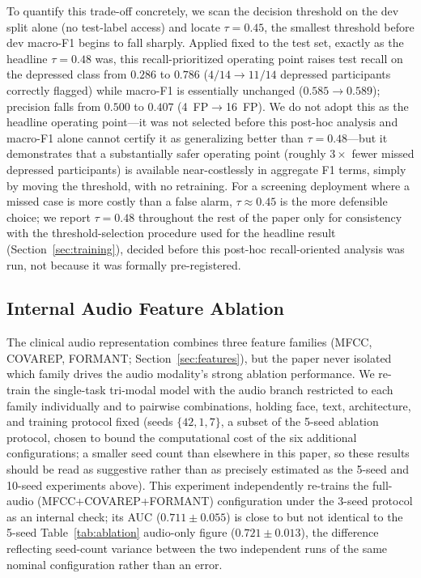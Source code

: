 \documentclass[journal]{IEEEtran}
\begin{document}
To quantify this trade-off concretely, we scan the decision threshold
on the dev split alone (no test-label access) and locate
$\tau{=}0.45$, the smallest threshold before dev macro-F1 begins to
fall sharply. Applied fixed to the test set, exactly as the headline
$\tau{=}0.48$ was, this recall-prioritized operating point raises
test recall on the depressed class from $0.286$ to $0.786$
($4/14\to11/14$ depressed participants correctly flagged) while
macro-F1 is essentially unchanged ($0.585\to0.589$); precision falls
from $0.500$ to $0.407$ (4~FP$\to$16~FP). We do not adopt this as the
headline operating point---it was not selected before this
post-hoc analysis and macro-F1 alone cannot certify it as
generalizing better than $\tau{=}0.48$---but it demonstrates that a
substantially safer operating point (roughly $3\times$ fewer missed
depressed participants) is available near-costlessly in aggregate
F1 terms, simply by moving the threshold, with no retraining. For a
screening deployment where a missed case is more costly than a false
alarm, $\tau{\approx}0.45$ is the more defensible choice; we report
$\tau{=}0.48$ throughout the rest of the paper only for consistency
with the threshold-selection procedure used for the headline result
(Section~\ref{sec:training}), decided before this post-hoc
recall-oriented analysis was run, not because it was formally
pre-registered.

\subsection{Internal Audio Feature Ablation}
\label{sec:audio_ablation}

The clinical audio representation combines three feature families
(MFCC, COVAREP, FORMANT; Section~\ref{sec:features}), but the paper
never isolated which family drives the audio modality's strong
ablation performance. We re-train the single-task tri-modal model
with the audio branch restricted to each family individually and to
pairwise combinations, holding face, text, architecture, and training
protocol fixed (seeds $\{42,1,7\}$, a subset of the 5-seed ablation
protocol, chosen to bound the computational cost of the six additional
configurations; a smaller seed count than elsewhere in this paper, so
these results should be read as suggestive rather than as precisely
estimated as the 5-seed and 10-seed experiments above). This
experiment independently re-trains the full-audio (MFCC+COVAREP+FORMANT)
configuration under the 3-seed protocol as an internal check; its
AUC ($0.711\pm0.055$) is close to but not identical to the 5-seed
Table~\ref{tab:ablation} audio-only figure ($0.721\pm0.013$), the
difference reflecting seed-count variance between the two independent
runs of the same nominal configuration rather than an error.
\end{document}
